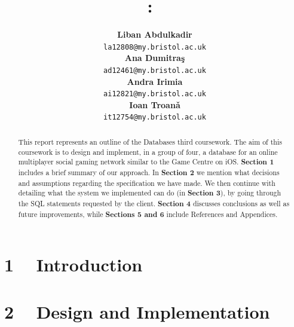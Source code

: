 \documentclass{article}
\title{
\vspace{0.2in}
\textmd{\textbf{\hmwkClass:\ \hmwkTitle}}\\
\vspace{0.5in}
\textmd{\hmwkDueDate}
\vspace{1.5in}
}
\author{
  \textbf{Liban Abdulkadir}\\
  \texttt{la12808@my.bristol.ac.uk}\\
  \textbf{Ana Dumitra\c{s}}\\
  \texttt{ad12461@my.bristol.ac.uk}\\
  \textbf{Andra Irimia}\\
  \texttt{ai12821@my.bristol.ac.uk}\\
  \textbf{Ioan Troan\v{a}}\\
  \texttt{it12754@my.bristol.ac.uk}\\
\vspace{1in}
}
\date{}
\begin{document}
\maketitle





\begin{abstract}
This report represents an outline of the Databases third coursework. The aim of this coursework is to design and implement, in a group of four, a database for an online multiplayer social gaming network similar to the Game Centre on iOS. \textbf{Section 1} includes a brief summary of our approach. In \textbf{Section 2} we mention what decisions and assumptions regarding the specification we have made. We then continue with detailing what the system we implemented can do (in \textbf{Section 3}), by going through the SQL statements requested by the client. \textbf{Section 4} discusses conclusions as well as future improvements, while \textbf{Sections 5 and 6} include References and Appendices.

\end{abstract}


\section{1  ~ Introduction}



\section{2 ~  Design and Implementation}
\end{document}
